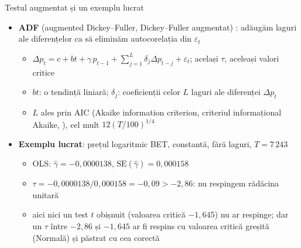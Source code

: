 \begin{frame}{Testul augmentat și un exemplu lucrat}
\itemsize{\small}
\begin{itemize}
    \item \textbf{ADF} (augmented Dickey--Fuller, Dickey--Fuller augmentat) : adăugăm laguri ale diferențelor ca să eliminăm autocorelația din $\varepsilon_t$
    \begin{itemize}
        \item $\Delta p_t = c + bt + \gamma\, p_{t-1} + \sum_{j=1}^{L} \delta_j \Delta p_{t-j} + \varepsilon_t$; același $\tau$, aceleași valori critice
        \item $bt$: o tendință liniară; $\delta_j$: coeficienții celor $L$ laguri ale diferenței $\Delta p_t$
        \item $L$ ales prin AIC (Akaike information criterion, criteriul informațional Akaike, ), cel mult $12(T/100)^{1/4}$
    \end{itemize}
    \item \textbf{Exemplu lucrat}: prețul logaritmic BET, constantă, fără laguri, $T = 7\,243$
    \begin{itemize}
        \item OLS: $\hat\gamma = -0{,}0000138$, $\mathrm{SE}(\hat\gamma) = 0{,}000158$
        \item $\tau = -0{,}0000138/0{,}000158 = -0{,}09 > -2{,}86$: nu respingem rădăcina unitară
        \item aici nici un test $t$ obișnuit (valoarea critică $-1{,}645$) nu ar respinge; dar un $\tau$ între $-2{,}86$ și $-1{,}645$ ar fi respins cu valoarea critică greșită (Normală) și păstrat cu cea corectă
    \end{itemize}
\end{itemize}
\end{frame}

